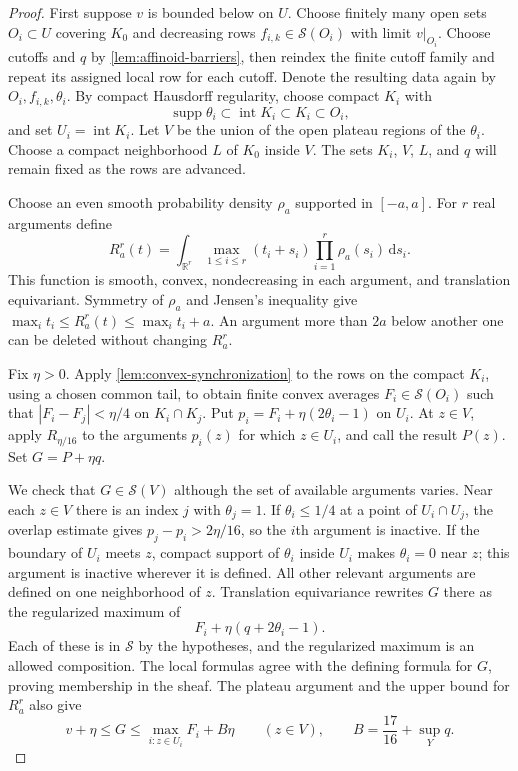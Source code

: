 \documentclass[11pt,a4paper]{amsart}
\begin{document}
\begin{proof}
First suppose $v$ is bounded below on $U$. Choose finitely many open sets $O_i\subset U$ covering $K_0$ and decreasing rows $f_{i,k}\in\mathscr{S}(O_i)$ with limit $v|_{O_i}$. Choose cutoffs and $q$ by \cref{lem:affinoid-barriers}, then reindex the finite cutoff family and repeat its assigned local row for each cutoff. Denote the resulting data again by $O_i,f_{i,k},\theta_i$. By compact Hausdorff regularity, choose compact $K_i$ with
\[
\operatorname{supp}\theta_i\subset\operatorname{int}K_i\subset K_i\subset O_i,
\]
and set $U_i=\operatorname{int}K_i$. Let $V$ be the union of the open plateau regions of the $\theta_i$. Choose a compact neighborhood $L$ of $K_0$ inside $V$. The sets $K_i$, $V$, $L$, and $q$ will remain fixed as the rows are advanced.

Choose an even smooth probability density $\rho_a$ supported in $[-a,a]$. For $r$ real arguments define
\[
R_a^r(t)=\int_{\mathbb{R}^r}\max_{1\leq i\leq r}(t_i+s_i)\prod_{i=1}^r\rho_a(s_i)\,\mathrm{d}s_i.
\]
This function is smooth, convex, nondecreasing in each argument, and translation equivariant. Symmetry of $\rho_a$ and Jensen's inequality give $\max_i t_i\leq R_a^r(t)\leq\max_i t_i+a$. An argument more than $2a$ below another one can be deleted without changing $R_a^r$.

Fix $\eta>0$. Apply \cref{lem:convex-synchronization} to the rows on the compact $K_i$, using a chosen common tail, to obtain finite convex averages $F_i\in\mathscr{S}(O_i)$ such that $|F_i-F_j|<\eta/4$ on $K_i\cap K_j$. Put $p_i=F_i+\eta(2\theta_i-1)$ on $U_i$. At $z\in V$, apply $R_{\eta/16}$ to the arguments $p_i(z)$ for which $z\in U_i$, and call the result $P(z)$. Set $G=P+\eta q$.

We check that $G\in\mathscr{S}(V)$ although the set of available arguments varies. Near each $z\in V$ there is an index $j$ with $\theta_j=1$. If $\theta_i\leq1/4$ at a point of $U_i\cap U_j$, the overlap estimate gives $p_j-p_i>2\eta/16$, so the $i$th argument is inactive. If the boundary of $U_i$ meets $z$, compact support of $\theta_i$ inside $U_i$ makes $\theta_i=0$ near $z$; this argument is inactive wherever it is defined. All other relevant arguments are defined on one neighborhood of $z$. Translation equivariance rewrites $G$ there as the regularized maximum of
\[
F_i+\eta(q+2\theta_i-1).
\]
Each of these is in $\mathscr{S}$ by the hypotheses, and the regularized maximum is an allowed composition. The local formulas agree with the defining formula for $G$, proving membership in the sheaf. The plateau argument and the upper bound for $R_a^r$ also give
\begin{equation}
\label{eq:gluing-bounds}
v+\eta\leq G\leq\max_{i:z\in U_i}F_i+B\eta
\qquad(z\in V),\qquad B=\frac{17}{16}+\sup_Yq.
\end{equation}


\end{proof}
\end{document}
